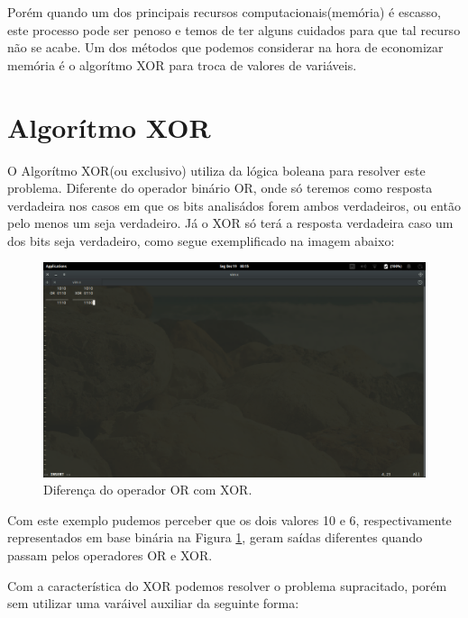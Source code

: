 \documentclass[12pt]{article}
\begin{document}
Porém quando um dos principais recursos computacionais(memória) é escasso, este processo pode ser penoso e temos de ter alguns cuidados para que tal recurso não se acabe.
Um dos métodos que podemos considerar na hora de economizar memória é o algorítmo XOR para troca de valores de variáveis.
\section{Algorítmo XOR} \label{sec:firstpage}

O Algorítmo XOR(ou exclusivo) utiliza da lógica boleana para resolver este problema. Diferente do operador binário OR, onde só teremos como resposta verdadeira nos casos em que os bits analisádos forem ambos verdadeiros, ou então pelo menos um seja verdadeiro. Já o XOR só terá a resposta verdadeira caso um dos bits seja verdadeiro, como segue exemplificado na imagem abaixo:


\begin{figure}[ht]
\centering
\includegraphics[width=1\textwidth]{comparacao.png}
\caption{Diferença do operador OR com XOR.}
\label{fig:exampleFig2}
\end{figure}

Com este exemplo pudemos perceber que os dois valores 10 e 6, respectivamente representados em base binária na Figura \ref{fig:exampleFig2}, geram saídas diferentes quando passam pelos operadores OR e XOR.

Com a característica do XOR podemos resolver o problema supracitado, porém sem utilizar uma varáivel auxiliar da seguinte forma:
\end{document}
